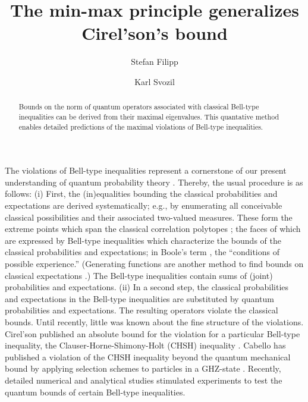 \documentclass[prl,showpacs,showkeys,amsfonts,amsmath,twocolumn]{revtex4}
\begin{document}
\title{The min-max principle generalizes Cirel'son's bound}
\author{Stefan Filipp}
\author{Karl Svozil}


\begin{abstract}
Bounds on the norm of quantum operators associated with classical Bell-type inequalities
can be derived from their maximal eigenvalues.
This quantative method enables detailed
predictions of the maximal violations of Bell-type inequalities.
\end{abstract}


\maketitle

The violations of Bell-type inequalities represent
a cornerstone of our present understanding of quantum probability theory
\cite{peres}.
Thereby, the usual procedure is as follows:
(i)
First, the (in)equalities bounding the classical probabilities and expectations are
derived systematically; e.g., by enumerating all conceivable classical possibilities
and their associated two-valued measures.
These form the extreme points which span
the classical correlation polytopes
\cite{cirelson:80,cirelson,froissart-81,pitowsky-86,pitowsky,pitowsky-89a,Pit-91,Pit-94,2000-poly,collins-gisin-2003,sliwa-2003};
the faces of which are expressed by Bell-type inequalities
which characterize the bounds of the classical probabilities and expectations;
in Boole's term \cite{Boole,Boole-62}, the ``conditions of possible experience.''
(Generating functions are another method to find bounds on classical expectations \cite{werner-wolf-2001,schachner-2003}.)
The Bell-type inequalities contain sums of (joint) probabilities and expectations.
(ii)
In a second step, the classical probabilities and expectations in
the Bell-type inequalities are substituted by quantum probabilities and expectations.
The resulting operators violate the classical bounds.
Until recently, little was known about the fine structure of the violations.
Cirel'son published an absolute bound for the violation for a particular Bell-type inequality,
the Clauser-Horne-Shimony-Holt (CHSH) inequality \cite{cirelson:80,cirelson:87,cirelson,khalfin-97}.
Cabello has published a violation of the CHSH inequality beyond the quantum mechanical
bound by applying selection schemes to particles in a GHZ-state
\cite{cabello-02a,cabello-02b}.
Recently, detailed numerical  \cite{filipp-svo-04-qpoly}
and analytical studies \cite{cabello-2003a} stimulated
experiments \cite{bovino-2003} to test the quantum bounds of certain Bell-type inequalities.
\end{document}
